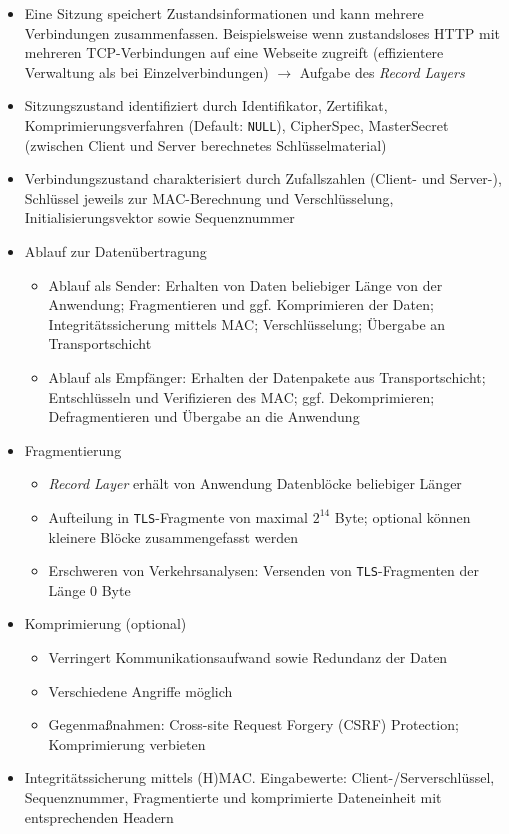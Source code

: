\begin{description}
\begin{itemize}
		\item Eine Sitzung speichert Zustandsinformationen und kann mehrere Verbindungen zusammenfassen. Beispielsweise wenn zustandsloses HTTP mit mehreren TCP-Verbindungen auf eine Webseite zugreift (effizientere Verwaltung als bei Einzelverbindungen) \(\rightarrow\) Aufgabe des \textit{Record Layers}
		\item Sitzungszustand identifiziert durch Identifikator, Zertifikat, Komprimierungsverfahren (Default: \texttt{NULL}), CipherSpec, MasterSecret (zwischen Client und Server berechnetes Schlüsselmaterial)
		\item Verbindungszustand charakterisiert durch Zufallszahlen (Client- und Server-), Schlüssel jeweils zur MAC-Berechnung und Verschlüsselung, Initialisierungsvektor sowie Sequenznummer
		\item Ablauf zur Datenübertragung
		\begin{itemize}
			\item Ablauf als Sender: Erhalten von Daten beliebiger Länge von der Anwendung; Fragmentieren und ggf. Komprimieren der Daten; Integritätssicherung mittels MAC; Verschlüsselung; Übergabe an Transportschicht
			\item Ablauf als Empfänger: Erhalten der Datenpakete aus Transportschicht; Entschlüsseln und Verifizieren des MAC; ggf. Dekomprimieren; Defragmentieren und Übergabe an die Anwendung
		\end{itemize}
		\item Fragmentierung
		\begin{itemize}
			\item \textit{Record Layer} erhält von Anwendung Datenblöcke beliebiger Länger
			\item Aufteilung in \texttt{TLS}-Fragmente von maximal \(2^{14}\) Byte; optional können kleinere Blöcke zusammengefasst werden
			\item Erschweren von Verkehrsanalysen: Versenden von \texttt{TLS}-Fragmenten der Länge \(0\) Byte
		\end{itemize}
		\item Komprimierung (optional)
		\begin{itemize}
			\item Verringert Kommunikationsaufwand sowie Redundanz der Daten
			\item Verschiedene Angriffe möglich
			\item Gegenmaßnahmen: Cross-site Request Forgery (CSRF) Protection; Komprimierung verbieten
		\end{itemize}
		\item Integritätssicherung mittels (H)MAC. Eingabewerte: Client-/Serverschlüssel, Sequenznummer, Fragmentierte und komprimierte Dateneinheit mit entsprechenden Headern

\end{itemize}
\end{description}
